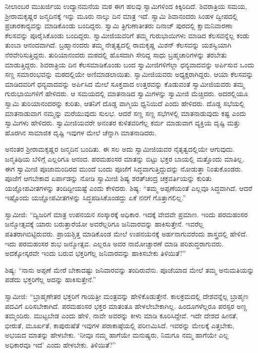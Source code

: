  ನೀಲಾಂಬರ ಮುಖರ್ಜಿಯ ಉದ್ಯಾನಮನೆಯ ಮಠ ಈಗ ಹಲವು ಸ್ವಾಮಿಗಳಿಂದ ಕಿಕ್ಕಿರಿದಿದೆ. ಶಿವರಾತ್ರಿಯ ಸಮಯ, ಶ‍್ರೀರಾಮಕೃಷ್ಣರ ಜನ್ಮದಿನಕ್ಕೆ ಇನ್ನು ಮೂರು ನಾಲ್ಕು ದಿನ ಮಾತ್ರ ಇದೆ. ಸ್ವಾಮಿ ಶಿವಾನಂದರು ಸಿಂಹಳ ದ್ವೀಪದಲ್ಲಿ ಪ್ರಚಾರಕಾರ‍್ಯವನ್ನು ಮಾಡಿಕೊಂಡು ಬಂದಿದ್ದರು. ಸ್ವಾಮಿ ತ್ರಿಗುಣಾತೀತರು ದಿನಾಜ್ ಪುರದಲ್ಲಿ ಕ್ಷಾಮನಿವಾರಣಾ ಕೆಲಸವನ್ನು ಪೂರೈಸಿಕೊಂಡು ಬಂದಿದ್ದರು. ಸ್ವಾಮೀಜಿಯವರಿಗೆ ತಮ್ಮ ಗುರುಭಾಯಿಗಳು ಮಾಡಿದ ಕೆಲಸವನ್ನೆಲ್ಲ ಕಂಡು ತುಂಬಾ ಆನಂದವಾಗಿದೆ. ಬ್ರಹ್ಮಾನಂದರು ತಮ್ಮ ನೇತೃತ್ವದಲ್ಲಿ ರಾಮಕೃಷ್ಣ ಮಿಶನ್ ಕೆಲಸವನ್ನು ಯಶಸ್ವಿಯಾಗಿ ನೆರವೇರಿಸುತ್ತಿದ್ದರು. ತುರಿಯಾನಂದರು ಮಠದಲ್ಲಿ ಹೊಸದಾಗಿ ಸೇರಿದ್ದ ಸಾಧು ಬ್ರಹ್ಮಚಾರಿಗಳನ್ನು ತರಬೇತು ಮಾಡುತ್ತಿದ್ದರು. ಶಿವರಾತ್ರಿಯ ದಿನ ಕೆಲಸಮಾಡಿಕೊಂಡು ಬಂದ ಸ್ವಾಮೀಜಿಗಳಿಗೆಲ್ಲಾ ಧನ್ಯವಾದವನ್ನು ಅರ್ಪಿಸುವ ಒಂದು ಸಣ್ಣ ಸಮಾರಂಭವನ್ನು ಮಠದಲ್ಲಿಯೇ ಅಣಿಮಾಡಲಾಯಿತು. ಸ್ವಾಮೀಜಿಯವರು ಅಧ್ಯಕ್ಷರಾಗಿದ್ದರು. ಆಯಾ ಕೆಲಸವನ್ನು ಮಾಡಿದವರಿಗೆ ಧನ್ಯವಾದವನ್ನು ಅರ್ಪಿಸಿದ ಮೇಲೆ ಸೂಕ್ತವಾದ ಉತ್ತರವನ್ನು ಕೊಡುವಂತೆ ಸ್ವಾಮೀಜಿಯವರು ತಮ್ಮ ಗುರುಭಾಯಿಗಳಿಗೆ ಹೇಳಿದರು. ಆ ಸಮಯದಲ್ಲಿ ಮಾತನಾಡಿದ ಸ್ವಾಮಿಗಳನ್ನು ಸ್ವಾಮೀಜಿ ಮೆಚ್ಚಿದರು. ಅದರಲ್ಲಿಯೂ ಸ್ವಾಮಿ ತುರಿಯಾನಂದರನ್ನು ಕುರಿತು, ಆತನಿಗೆ ದೊಡ್ಡ ವಾಗ್ಮಿಯ ಧ್ವನಿಯಿದೆ ಎಂದು ಹೇಳಿದರು. ದೊಡ್ಡ ಸಭೆಯಲ್ಲಿ ಮಾತನಾಡುವಾಗ ನಮ್ಮನ್ನು ಮರೆಯುವುದು ಸುಲಭ. ಆದರೆ ಸಣ್ಣ ಸಣ್ಣ ಸಭೆಗಳಲ್ಲಿ ಮಾತನಾಡುವುದು ಕಷ್ಟ ಎಂದು ಸ್ವಾಮಿಗಳು ಹೇಳಿದರು. ಸ್ವಾಮೀಜಿಯವರೇ ಅನಂತರ ಕುಳಿತವರಿಗೆಲ್ಲ ಕರ್ಮ ಮಾಡುವಾಗ ವ್ಯಕ್ತಿಯ ದೃಷ್ಟಿ ಮತ್ತು ಹೊರಗಿನ ಸಾಮಾಜಿಕ ದೃಷ್ಟಿ ಇವುಗಳ ಮೇಲೆ ಚೆನ್ನಾಗಿ ಮಾತನಾಡಿದರು. 

 ಅನಂತರ ಶ‍್ರೀರಾಮಕೃಷ್ಣರ ಜನ್ಮದಿನ ಬಂದಿತು. ಈ ಸಲ ಅದು ಸ್ವಾಮೀಜಿಯವರ ನೈತೃತ್ವದಲ್ಲಿಯೇ ಆಗುವುದು. ಜನ್ಮತಿಥಿಯ ಬೆಳಿಗ್ಗೆ ಎಲ್ಲರಿಗೂ ಆನಂದ. ಪರಮಹಂಸರ ಮಾತನ್ನು ಬಿಟ್ಟು ಭಕ್ತರ ಬಾಯಲ್ಲಿ ಮತ್ತೊಂದು ಮಾತಿಲ್ಲ. ಈಗ ಸ್ವಾಮೀಜಿ ಪೂಜಾಮಂದಿರದ ಮುಂದೆ ಬಂದು ಪೂಜೆಗೆ ಸಿದ್ಧವಾಗುತ್ತಿದ್ದುದನ್ನು ನೋಡುತ್ತಾ ನಿಂತುಕೊಂಡರು. ಪೂಜೆಗೆ ಆಗಬೇಕಾದ ಏರ್ಪಾಡನ್ನು ನೋಡಿ ಸ್ವಾಮೀಜಿ ಶಿಷ್ಯ ಶರತ್‍ಚಂದ್ರ ಚಕ್ರವರ್ತಿಯನ್ನು ಕುರಿತು ಯಜ್ಞೋಪವೀತಗಳನ್ನು ತಂದಿದ್ದೀಯಷ್ಟೆ ಎಂದು ಕೇಳಿದರು. ಶಿಷ್ಯ: “ತಮ್ಮ ಅಪ್ಪಣೆಯಂತೆ ಎಲ್ಲವೂ ಸಿದ್ಧವಾಗಿದೆ. ಆದರೆ ಇಷ್ಟೊಂದು ಯಜ್ಞೋಪವೀತಗಳನ್ನು ಸಿದ್ಧಪಡಿಸಿಕೊಂಡದ್ದು ಏಕೆ ನನಗೆ ಗೊತ್ತಾಗಲಿಲ್ಲ.” 

 ಸ್ವಾಮೀಜಿ: “ದ್ವಿಜರಿಗೆ ಮಾತ್ರ ಉಪನಯನ ಸಂಸ್ಕಾರಕ್ಕೆ ಅಧಿಕಾರ. ಇದಕ್ಕೆ ವೇದವೇ ಪ್ರಮಾಣ. ಇಂದು ಪರಮಹಂಸರ ಜನ್ಮೋತ್ಸವಕ್ಕೆ ಯಾರು ಬರುತ್ತಾರೆಯೋ ಅವರೆಲ್ಲರಿಗೂ ಜನಿವಾರವನ್ನು ಹಾಕಿಸುತ್ತೇನೆ. ಇವರೆಲ್ಲ ಪತಿತರಾಗಿಬಿಟ್ಟಿರುವರು. ಪ್ರಾಯಶ್ಚಿತ್ತ ಮಾಡಿಕೊಂಡ ಮೇಲೆ ಉಪನಯನಕ್ಕೆ ಅರ್ಹನಾಗುವರೆಂದು ಶಾಸ್ತ್ರದಲ್ಲಿ ಹೇಳಿದೆ. ಇದು ಪರಮಹಂಸರ ಶುಭ ಜನ್ಮೋತ್ಸವ. ಎಲ್ಲರೂ ಅವರ ನಾಮೋಚ್ಚಾರಣೆ ಮಾಡಿ ಪರಿಶುದ್ಧರಾಗುವರು. ಅದಕ್ಕೋಸ್ಕರವೇ ಇಂದು ಬರುವ ಭಕ್ತರಿಗೆಲ್ಲ ಜನಿವಾರವನ್ನು ಹಾಕಿಸಬೇಕು ತಿಳಿಯಿತೆ?” 

 ಶಿಷ್ಯ: “ನಾನು ಅಪ್ಪಣೆ ಮೇರೆ ಬೇಕಾದಷ್ಟು ಜನಿವಾರವನ್ನು ತಂದಿರುವೆನು. ಪೂಜೆಯಾದ ಮೇಲೆ ತಮ್ಮ ಅನುಮತಿಯನ್ನು ಪಡೆದು ಭಕ್ತರಿಗೆಲ್ಲ ಅದನ್ನು ಹಾಕಿಸುತ್ತೇನೆ.” 

 ಸ್ವಾಮೀಜಿ: “ಬ್ರಾಹ್ಮಣೇತರ ಭಕ್ತರಿಗೆ ಗಾಯತ್ರೀ ಮಂತ್ರವನ್ನು ಹೇಳಿಕೊಡುತ್ತೇನೆ. ಕಾಲಕ್ರಮದಲ್ಲಿ ದೇಶವನ್ನೆಲ್ಲ ಬ್ರಾಹ್ಮಣ ಪದವಿಗೆ ಏರಿಸಬೇಕಾಗಿದೆ. ಪರಮಹಂಸರ ಭಕ್ತರ ಮಾತಂತೂ ಹೇಳಲೇಬೇಕಾಗಿಲ್ಲ. ಹಿಂದೂಗಳೆಲ್ಲರೂ ಪರಸ್ಪರ ಅಣ್ಣ ತಮ್ಮಂದಿರು. ಮುಟ್ಟಬೇಡ ಎಂದು ಹೇಳಿ, ನಾವೇ ಅವರನ್ನು ಕೀಳು ಮಾಡಿ ಕೂರಿಸಿದ್ದೇವೆ. ಇದೇ ದೇಶದ ಹೀನತೆ, ಭೀರುತೆ, ಮೂರ್ಖತೆ, ಕಾಪುರುಷೆತೆ ಇವುಗಳ ಪರಾಕಾಷ್ಠೆಯಲ್ಲಿ ಪರಿಣಮಿಸಿದೆ. ಇವರನ್ನು ಮೇಲಕ್ಕೆ ಎತ್ತಬೇಕು, ಅಭಯದ ಮಾತನ್ನು ಹೇಳಬೇಕು. ‘ನೀವೂ ನಮ್ಮ ಹಾಗೆಯೇ ಮನುಷ್ಯರು, ನಿಮಗೂ ನಮ್ಮ ಹಾಗೆಯೇ ಎಲ್ಲ ಅಧಿಕಾರವೂ ಇದೆ’ ಎಂದು ಹೇಳಬೇಕು. ತಿಳಿಯಿತೆ?” 

